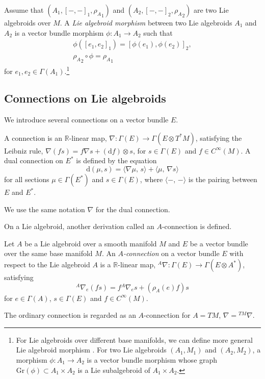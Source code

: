 \documentclass[pdftex]{sigma}
\numberwithin{equation}{section}
\def\bR{{\mathbb{R}}}
\newcommand{\rhoa}{{\rho_A}}
\newcommand{\bracket}[2]{\langle #1,\,#2\rangle}
\newcommand{\inner}[2]{{({{#1},{#2}})}}
\newcommand{\rd}{\mathrm{d}}
\newcommand{\anabla}{{{}^A \nabla}}
\begin{document}
\begin{Definition}
Assume that $(A_1, [-,-]_1, \rhoa_1)$ and $(A_2, [-,-]_2, \rhoa_2)$ are
two Lie algebroids over $M$.
A \textit{Lie algebroid morphism} between two Lie algebroids $A_1$ and $A_2$
is a vector bundle morphism $\phi\colon A_1 \rightarrow A_2$
such that
\begin{gather}
\phi([e_1, e_2]_1) = [\phi(e_1), \phi(e_2)]_2,\nonumber
\\
\rhoa_2 \circ \phi = \rhoa_1
\label{LAmorphism02}
\end{gather}
for $e_1, e_2 \in \Gamma(A_1)$.\footnote{For Lie algebroids over different base manifolds, we can define more general Lie algebroid morphism \cite{Mackenzie}.
For two Lie algebroids $(A_1, M_1)$ and $(A_2, M_2)$, a morphism $\phi\colon A_1 \rightarrow A_2$ is a vector bundle morphism whose graph
$\mathrm{Gr}(\phi) \subset A_1 \times A_2$ is a Lie subalgebroid of $A_1 \times A_2$.}
\end{Definition}

\subsection{Connections on Lie algebroids}\label{connectionLA}
We introduce several connections on a vector bundle $E$.
\begin{Definition}
A connection is an $\bR$-linear map,
$\nabla\colon\Gamma(E)\rightarrow \Gamma(E \otimes T^*M)$,
satisfying the Leibniz rule,
$
\nabla (f s) = f \nabla s + (\rd f) \otimes s$,
for $s \in \Gamma(E)$ and $f \in C^{\infty}(M)$.
A dual connection on $E^*$ is defined by the equation
\[
\rd \inner{\mu}{s} = \bracket{\nabla \mu}{s} + \bracket{\mu}{\nabla s}
\]
for all sections $\mu \in \Gamma(E^*)$ and $s \in \Gamma(E)$,
where $\bracket{-}{-}$ is the pairing between $E$ and $E^*$.
\end{Definition}
We use the same notation $\nabla$ for the dual connection.

On a Lie algebroid, another derivation called an $A$-connection is defined.
\begin{Definition}
Let $A$ be a Lie algebroid over a smooth manifold $M$ and $E$ be a vector bundle over the same base manifold $M$.
An \textit{$A$-connection} on a vector bundle $E$
with respect to the Lie algebroid $A$ is a $\bR$-linear
map,
$\anabla\colon \Gamma(E) \rightarrow \Gamma(E \otimes A^*)$,
satisfying
\[
\anabla_e (f s) = f \anabla_e s + (\rhoa(e) f) s
\]
for $e \in \Gamma(A)$, $s \in \Gamma(E)$ and $f \in C^{\infty}(M)$.
\end{Definition}
The ordinary connection is regarded as an
$A$-connection for $A=TM$, $\nabla = {}^{TM} \nabla$.
\end{document}
